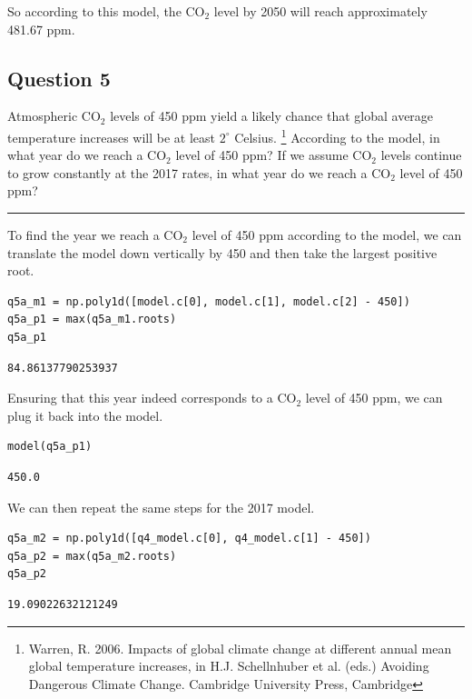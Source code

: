 \documentclass[11pt]{article}
\begin{document}
So according to this model, the CO\(_{\text{2}}\) level by 2050 will
reach approximately 481.67 ppm.

\subsection{Question 5}
\label{sec:org95871d8}

Atmospheric CO\(_{\text{2}}\) levels of 450 ppm yield a likely chance that
global average temperature increases will be at least \(2^{\circ}\)
Celsius. \footnote{Warren, R. 2006. Impacts of global climate change at different annual mean global temperature increases, in H.J. Schellnhuber et al. (eds.) Avoiding Dangerous Climate Change. Cambridge University Press, Cambridge}
According to the model, in what year do we reach a CO\(_{\text{2}}\) level of 450 ppm?
If we assume CO\(_{\text{2}}\) levels continue to grow constantly at the 2017 rates,
in what year do we reach a CO\(_{\text{2}}\) level of 450 ppm?

\noindent\rule{\textwidth}{0.5pt}

To find the year we reach a CO\(_{\text{2}}\) level of 450 ppm according to the model,
we can translate the model down vertically by 450 and then take the
largest positive root.

\begin{verbatim}
q5a_m1 = np.poly1d([model.c[0], model.c[1], model.c[2] - 450])
q5a_p1 = max(q5a_m1.roots)
q5a_p1
\end{verbatim}

\begin{verbatim}
84.86137790253937
\end{verbatim}

Ensuring that this year indeed corresponds to a CO\(_{\text{2}}\) level of 450 ppm,
we can plug it back into the model.

\begin{verbatim}
model(q5a_p1)
\end{verbatim}

\begin{verbatim}
450.0
\end{verbatim}

We can then repeat the same steps for the 2017 model.

\begin{verbatim}
q5a_m2 = np.poly1d([q4_model.c[0], q4_model.c[1] - 450])
q5a_p2 = max(q5a_m2.roots)
q5a_p2
\end{verbatim}

\begin{verbatim}
19.09022632121249
\end{verbatim}
\end{document}
